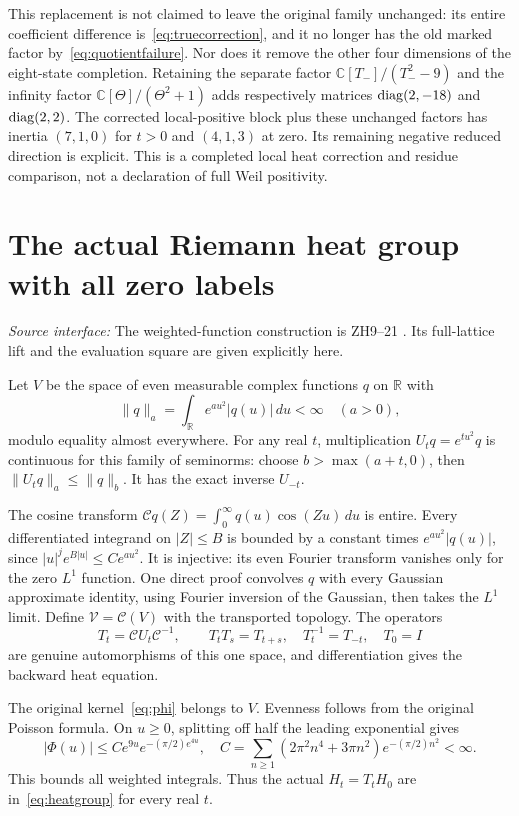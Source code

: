 \documentclass[11pt,a4paper]{article}
\theoremstyle{definition}\newtheorem{definition}[theorem]{Definition}\newtheorem{remark}[theorem]{Remark}
\newcommand{\C}{\mathbb C}\newcommand{\R}{\mathbb R}\newcommand{\Z}{\mathbb Z}\newcommand{\B}{\mathbb B}
\newcommand{\src}[1]{\textit{Source interface:} #1}
\begin{document}
This replacement is not claimed to leave the original family unchanged: its entire coefficient difference is~\eqref{eq:truecorrection}, and it no longer has the old marked factor by~\eqref{eq:quotientfailure}. Nor does it remove the other four dimensions of the eight-state completion. Retaining the separate factor $\C[T_-]/(T_-^2-9)$ and the infinity factor $\C[\Theta]/(\Theta^2+1)$ adds respectively matrices $\operatorname{diag}(2,-18)$ and $\operatorname{diag}(2,2)$. The corrected local-positive block plus these unchanged factors has inertia $(7,1,0)$ for $t>0$ and $(4,1,3)$ at zero. Its remaining negative reduced direction is explicit. This is a completed local heat correction and residue comparison, not a declaration of full Weil positivity.

\section{The actual Riemann heat group with all zero labels}
\src{The weighted-function construction is ZH9--21 \cite{ZH}. Its full-lattice lift and the evaluation square are given explicitly here.}

Let $V$ be the space of even measurable complex functions $q$ on $\R$ with
\[
 \|q\|_a=\int_\R e^{a u^2}|q(u)|\,du<\infty\quad(a>0),
\]
modulo equality almost everywhere. For any real $t$, multiplication $U_tq=e^{tu^2}q$ is continuous for this family of seminorms: choose $b>\max(a+t,0)$, then $\|U_tq\|_a\le\|q\|_b$. It has the exact inverse $U_{-t}$.

The cosine transform $\mathcal Cq(Z)=\int_0^\infty q(u)\cos(Zu)\,du$ is entire. Every differentiated integrand on $|Z|\le B$ is bounded by a constant times $e^{a u^2}|q(u)|$, since $|u|^j e^{B|u|}\le C e^{a u^2}$. It is injective: its even Fourier transform vanishes only for the zero $L^1$ function. One direct proof convolves $q$ with every Gaussian approximate identity, using Fourier inversion of the Gaussian, then takes the $L^1$ limit. Define $\mathcal V=\mathcal C(V)$ with the transported topology. The operators
\begin{equation}
 T_t=\mathcal C U_t\mathcal C^{-1},\qquad
 T_tT_s=T_{t+s},\quad T_t^{-1}=T_{-t},\quad T_0=I         \label{eq:heatgroup}
\end{equation}
are genuine automorphisms of this one space, and differentiation gives the backward heat equation.

The original kernel~\eqref{eq:phi} belongs to $V$. Evenness follows from the original Poisson formula. On $u\ge0$, splitting off half the leading exponential gives
\[
 |\Phi(u)|\le C e^{9u}e^{-(\pi/2)e^{4u}},
 \quad C=\sum_{n\ge1}(2\pi^2n^4+3\pi n^2)e^{-(\pi/2)n^2}<\infty.
\]
This bounds all weighted integrals. Thus the actual $H_t=T_tH_0$ are in~\eqref{eq:heatgroup} for every real $t$.
\end{document}
